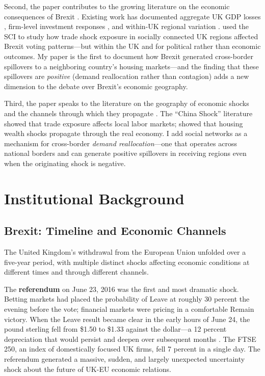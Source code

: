 \documentclass[12pt]{article}
\begin{document}
Second, the paper contributes to the growing literature on the economic consequences of Brexit \citep{sampson2017brexit, born2019costs, bloom2025brexit, hassan2024global}. Existing work has documented aggregate UK GDP losses \citep{born2019costs}, firm-level investment responses \citep{hassan2024global}, and within-UK regional variation \citep{dhingra2017local}. \citet{mastrosavvas2024social} used the SCI to study how trade shock exposure in socially connected UK regions affected Brexit voting patterns---but within the UK and for political rather than economic outcomes. My paper is the first to document how Brexit generated cross-border spillovers to a neighboring country's housing markets---and the finding that these spillovers are \textit{positive} (demand reallocation rather than contagion) adds a new dimension to the debate over Brexit's economic geography.

Third, the paper speaks to the literature on the geography of economic shocks and the channels through which they propagate \citep{autor2013china, moretti2011local, mian2014house}. The ``China Shock'' literature \citep{autor2013china} showed that trade exposure affects local labor markets; \citet{mian2014house} showed that housing wealth shocks propagate through the real economy. I add social networks as a mechanism for cross-border \textit{demand reallocation}---one that operates across national borders and can generate positive spillovers in receiving regions even when the originating shock is negative.


\section{Institutional Background}

\subsection{Brexit: Timeline and Economic Channels}

The United Kingdom's withdrawal from the European Union unfolded over a five-year period, with multiple distinct shocks affecting economic conditions at different times and through different channels.

The \textbf{referendum} on June 23, 2016 was the first and most dramatic shock. Betting markets had placed the probability of Leave at roughly 30 percent the evening before the vote; financial markets were pricing in a comfortable Remain victory. When the Leave result became clear in the early hours of June 24, the pound sterling fell from \$1.50 to \$1.33 against the dollar---a 12 percent depreciation that would persist and deepen over subsequent months \citep{born2019costs}. The FTSE 250, an index of domestically focused UK firms, fell 7 percent in a single day. The referendum generated a massive, sudden, and largely unexpected uncertainty shock about the future of UK-EU economic relations.
\end{document}
